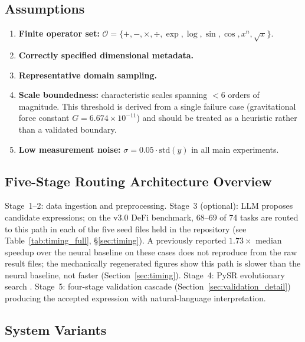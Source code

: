 \documentclass[twoside,11pt]{article}
\begin{document}
\subsection{Assumptions}\label{subsec:assumptions}
\label{sec:assumptions}

\begin{enumerate}
\item \textbf{Finite operator set:}
  $\mathcal{O} = \{+,-,\times,\div,\exp,\log,\sin,\cos,x^n,\sqrt{x}\}$.
\item \textbf{Correctly specified dimensional metadata.}
\item \textbf{Representative domain sampling.}
\item \textbf{Scale boundedness:} characteristic scales spanning
  $<6$ orders of magnitude.
  This threshold is derived from a single failure case (gravitational force
  constant $G = 6.674 \times 10^{-11}$) and should be treated as a heuristic
  rather than a validated boundary.
\item \textbf{Low measurement noise:}
  $\sigma = 0.05 \cdot \mathrm{std}(y)$ in all main experiments.
\end{enumerate}

\subsection{Five-Stage Routing Architecture Overview}\label{subsec:fivestage-routing-architecture-overview}
\label{sec:validation_framework}

Stage~1--2: data ingestion and preprocessing.
Stage~3 (optional): LLM proposes candidate expressions; on the v3.0 DeFi
benchmark, 68--69 of 74 tasks are routed to this path in each of the five
seed files held in the repository (see
Table~\ref{tab:timing_full}, \S\ref{sec:timing}). A previously reported
$1.73\times$ median speedup over the neural baseline on these cases does
not reproduce from the raw result files; the mechanically regenerated
figures show this path is slower than the neural baseline, not faster
(Section~\ref{sec:timing}).
Stage~4: PySR evolutionary search \citep{cranmer2023pysr}.
Stage~5: four-stage validation cascade (Section~\ref{sec:validation_detail})
producing the accepted expression with natural-language interpretation.

\subsection{System Variants}\label{subsec:system-variants}
\label{sec:arch_variants}
\end{document}
